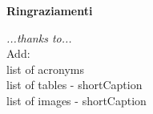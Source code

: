 \thispagestyle{empty}

\begin{center}
  {\bf \Huge Ringraziamenti}
\end{center}

\vspace{4cm}


\emph{
  ...thanks to...
}
\\
Add:\\
list of acronyms\\
list of tables - shortCaption\\
list of images - shortCaption
